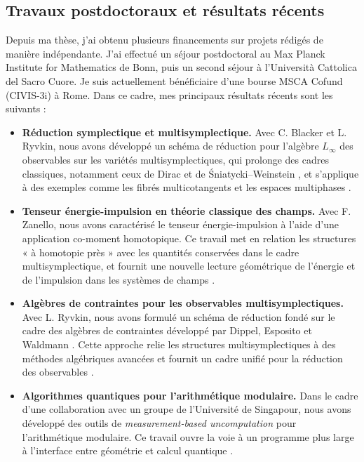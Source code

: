 \documentclass[a4paper]{article}
\begin{document}
\subsection*{Travaux postdoctoraux et résultats récents}

Depuis ma thèse, j’ai obtenu plusieurs financements sur projets rédigés de manière indépendante. J’ai effectué un séjour postdoctoral au Max Planck Institute for Mathematics de Bonn, puis un second séjour à l’Università Cattolica del Sacro Cuore. Je suis actuellement bénéficiaire d’une bourse MSCA Cofund (CIVIS-3i) à Rome. Dans ce cadre, mes principaux résultats récents sont les suivants :

\begin{itemize}[noitemsep,topsep=0pt,parsep=0pt,partopsep=0pt]
\item \textbf{Réduction symplectique et multisymplectique.}
Avec C. Blacker et L. Ryvkin, nous avons développé un schéma de réduction pour l’algèbre \(L_\infty\) des observables sur les variétés multisymplectiques, qui prolonge des cadres classiques, notamment ceux de Dirac et de Śniatycki--Weinstein \cite{SniatyckiWeinstein83}, et s’applique à des exemples comme les fibrés multicotangents et les espaces multiphases \cite{Blacker2024}.

\item \textbf{Tenseur énergie-impulsion en théorie classique des champs.}
Avec F. Zanello, nous avons caractérisé le tenseur énergie-impulsion à l’aide d’une application co-moment homotopique.
Ce travail met en relation les structures « à homotopie près » avec les quantités conservées dans le cadre multisymplectique, et fournit une nouvelle lecture géométrique de l’énergie et de l’impulsion dans les systèmes de champs \cite{Miti2026}.

\item \textbf{Algèbres de contraintes pour les observables multisymplectiques.}
Avec L. Ryvkin, nous avons formulé un schéma de réduction fondé sur le cadre des algèbres de contraintes développé par Dippel, Esposito et Waldmann \cite{Dippell2023, dippelkern, dippelespositowaldmann}.
Cette approche relie les structures multisymplectiques à des méthodes algébriques avancées et fournit un cadre unifié pour la réduction des observables \cite{Miti2025}.

\item \textbf{Algorithmes quantiques pour l’arithmétique modulaire.}
Dans le cadre d’une collaboration avec un groupe de l’Université de Singapour, nous avons développé des outils de \emph{measurement-based uncomputation} pour l’arithmétique modulaire.
Ce travail ouvre la voie à un programme plus large à l’interface entre géométrie et calcul quantique \cite{Luongo2024,Luongo2025}.


\end{itemize}
\end{document}

